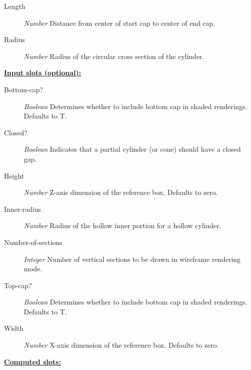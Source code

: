 \documentclass [11pt]{book}
\begin{document}
\begin{itemize}
\begin{description}

\item [Length]
\emph{Number} Distance from center of start cap to center of end cap.


\item [Radius]
\emph{Number} Radius of the circular cross section of the cylinder.


\end{description}






\textbf{
\underline{Input slots (optional):}}

\begin{description}

\item [Bottom-cap?]
\emph{Boolean} Determines whether to include bottom cap in shaded renderings. Defaults to T.


\item [Closed?]
\emph{Boolean} Indicates that a partial cylinder (or cone) should have a closed gap.


\item [Height]
\emph{Number} Z-axis dimension of the reference box. Defaults to zero.


\item [Inner-radius]
\emph{Number} Radius of the hollow inner portion for a hollow cylinder.


\item [Number-of-sections]
\emph{Integer} Number of vertical sections to be drawn in wireframe rendering mode.


\item [Top-cap?]
\emph{Boolean} Determines whether to include bottom cap in shaded renderings. Defaults to T.


\item [Width]
\emph{Number} X-axis dimension of the reference box. Defaults to zero.


\end{description}






\textbf{
\underline{Computed slots:}}

\begin{description}


\end{description}
\end{itemize}
\end{document}
